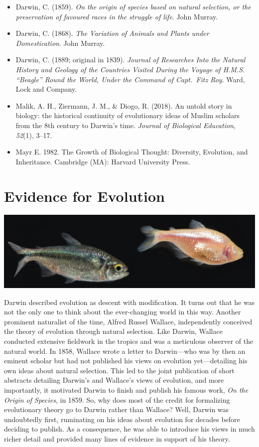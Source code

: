 \documentclass[
]{book}
\begin{document}
\begin{itemize}
\item
  Darwin, C. (1859). \emph{On the origin of species based on natural selection, or the preservation of favoured races in the struggle of life}. John Murray.
\item
  Darwin, C. (1868). \emph{The Variation of Animals and Plants under Domestication}. John Murray.
\item
  Darwin, C. (1889; original in 1839). \emph{Journal of Researches Into the Natural History and Geology of the Countries Visited During the Voyage of H.M.S. ``Beagle'' Round the World, Under the Command of Capt.~Fitz Roy}. Ward, Lock and Company.
\item
  Malik, A. H., Ziermann, J. M., \& Diogo, R. (2018). An untold story in biology: the historical continuity of evolutionary ideas of Muslim scholars from the 8th century to Darwin's time. \emph{Journal of Biological Education}, \emph{52}(1), 3--17.
\item
  Mayr E. 1982. The Growth of Biological Thought: Diversity, Evolution, and Inheritance. Cambridge (MA): Harvard University Press.
\end{itemize}

\hypertarget{evidence-for-evolution}{%
\chapter{Evidence for Evolution}\label{evidence-for-evolution}}

\includegraphics[width=1\linewidth]{images/chapter3_title}

Darwin described evolution as descent with modification. It turns out that he was not the only one to think about the ever-changing world in this way. Another prominent naturalist of the time, Alfred Russel Wallace, independently conceived the theory of evolution through natural selection. Like Darwin, Wallace conducted extensive fieldwork in the tropics and was a meticulous observer of the natural world. In 1858, Wallace wrote a letter to Darwin---who was by then an eminent scholar but had not published his views on evolution yet---detailing his own ideas about natural selection. This led to the joint publication of short abstracts detailing Darwin's and Wallace's views of evolution, and more importantly, it motivated Darwin to finish and publish his famous work, \emph{On the Origin of Species}, in 1859. So, why does most of the credit for formalizing evolutionary theory go to Darwin rather than Wallace? Well, Darwin was undoubtedly first, ruminating on his ideas about evolution for decades before deciding to publish. As a consequence, he was able to introduce his views in much richer detail and provided many lines of evidence in support of his theory.
\end{document}
